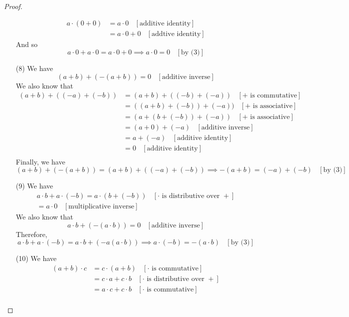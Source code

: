 \documentclass{book}
\begin{document}
\begin{proof}
\begin{itemize}[itemsep = 0pt]
        \begin{align*}
            a \cdot (0 + 0) & = a \cdot 0 \ \ \ \ [\text{additive identity}] \\
            & = a \cdot 0 + 0 \ \ \ \ [\text{addtive identity}]
        \end{align*}
        And so
        $$a \cdot 0 + a \cdot 0 = a \cdot 0 + 0 \implies a \cdot 0 = 0 \ \ \ \ [\text{by (3)}]$$
        \item[(8)] We have
        $$(a + b) + (-(a + b)) = 0 \ \ \ \ [\text{additive inverse}]$$
        We also know that
        \begin{align*}
            (a + b) + ((-a) + (-b)) & = (a + b) + ((-b) + (-a)) \ \ \ \ [+ \text{ is commutative}] \\
            & = ((a + b) + (-b)) + (-a)) \ \ \ \ [+ \text{ is associative}] \\
            & = (a + (b + (-b)) + (-a)) \ \ \ \ [+ \text{ is associative}] \\
            & = (a + 0) + (-a) \ \ \ \ [\text{additive inverse}] \\
            & = a + (-a) \ \ \ \ [\text{additive identity}] \\
            & = 0 \ \ \ \ [\text{additive identity}] \\
        \end{align*}
        Finally, we have
        $$(a + b) + (-(a + b)) = (a + b) + ((-a) + (-b)) \implies -(a + b) = (-a) + (-b) \ \ \ \ [\text{by (3)}]$$
        \item[(9)] We have
        \begin{align*}
            a \cdot b + a \cdot (-b) = a \cdot (b + (-b)) \ \ \ \ [\cdot \text{ is distributive over } +] \\
            = a \cdot 0 \ \ \ \ [\text{multiplicative inverse}]
        \end{align*}
        We also know that
        $$a \cdot b + (-(a \cdot b)) = 0 \ \ \ \ [\text{additive inverse}]$$
        Therefore,
        $$a \cdot b + a \cdot (-b) = a \cdot b + (-a(a \cdot b)) \implies a \cdot (-b) = -(a \cdot b) \ \ \ \ [\text{by (3)}]$$
        \item[(10)] We have
        \begin{align*}
            (a + b) \cdot c & = c \cdot (a + b) \ \ \ \ [\cdot \text{ is commutative}] \\
            & = c \cdot a + c \cdot b \ \ \ \ [\cdot \text{ is distributive over } +] \\
            & = a \cdot c + c \cdot b \ \ \ \ [\cdot \text{ is commutative}] \\

\end{align*}
\end{itemize}
\end{proof}
\end{document}

